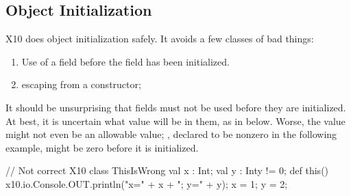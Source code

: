 \subsection{Object Initialization}

X10 does object initialization safely.  It avoids a few classes of bad things: 
\begin{enumerate}
\item Use of a field before the field has been initialized.
\item {} escaping from a constructor;
\end{enumerate}

It should be unsurprising that fields must not be used before they are
initialized. At best, it is uncertain what value will be in them, as in
 below. Worse, the value might not even be an allowable value; ,
declared to be nonzero in the following example, might be zero before it is
initialized. 
\begin{xten}
// Not correct X10
class ThisIsWrong {
  val x : Int;
  val y : Int{y != 0};
  def this() {
    x10.io.Console.OUT.println("x=" + x + "; y=" + y);
    x = 1; y = 2;
  }
}
\end{xten}

